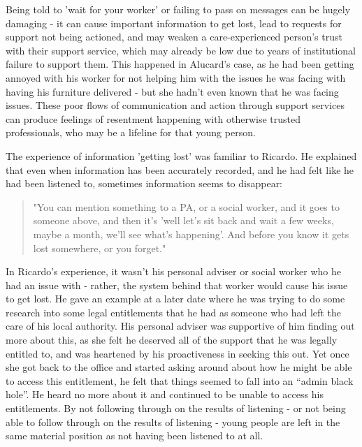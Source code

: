 Being told to 'wait for your worker' or failing to pass on messages can be hugely damaging - it can cause important information to get lost, lead to requests for support not being actioned, and may weaken a care-experienced person’s trust with their support service, which may already be low due to years of institutional failure to support them.  This happened in Alucard’s case, as he had been getting annoyed with his worker for not helping him with the issues he was facing with having his furniture delivered - but she hadn’t even known that he was facing issues. These poor flows of communication and action through support services can produce feelings of resentment happening with otherwise trusted professionals, who may be a lifeline for that young person. 

The experience of information 'getting lost' was familiar to Ricardo. He explained that even when information has been accurately recorded, and he had felt like he had been listened to, sometimes information seems to disappear:

\begin{quote}
"You can mention something to a PA, or a social worker, and it goes to someone above, and then it's 'well let's sit back and wait a few weeks, maybe a month, we'll see what's happening'. And before you know it gets lost somewhere, or you forget."
\end{quote}

In Ricardo's experience, it wasn’t his personal adviser or social worker who he had  an issue with - rather, the system behind that worker would cause his issue to get lost. He gave an example at a later date where he was trying to do some research into some legal entitlements that he had as someone who had left the care of his local authority. His personal adviser was supportive of him finding out more about this, as she felt he deserved all of the support that he was legally entitled to, and was heartened by his proactiveness in seeking this out. Yet once she got back to the office and started asking around about how he might be able to access this entitlement, he felt that things seemed to fall into an “admin black hole”. He heard no more about it and continued to be unable to access his entitlements. By not following through on the results of listening - or not being able to follow through on the results of listening - young people are left in the same material position as not having been listened to at all. 

